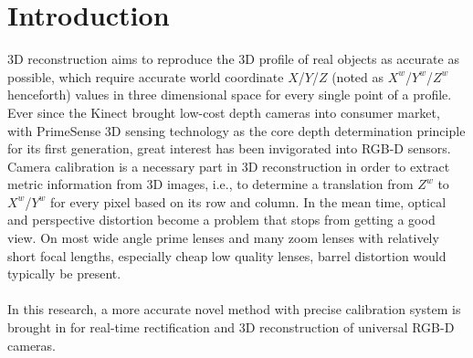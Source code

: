 \chapter{Introduction} %
\label{sens_introduction} %
3D reconstruction aims to reproduce the 3D profile of real objects as accurate as possible, which require accurate world coordinate \(X\)/\(Y\)/\(Z\) (noted as \(X^{w}\)/\(Y^{w}\)/\(Z^{w}\)  henceforth) values in three dimensional space for every single point of a profile. Ever since the Kinect brought low-cost depth cameras into consumer market, with PrimeSense 3D sensing technology as the core depth determination principle for its first generation, great interest has been invigorated into RGB-D sensors. Camera calibration is a necessary part in 3D reconstruction in order to extract metric information from 3D images, i.e., to determine a translation from \(Z^{w}\) to \(X^{w}\)/\(Y^{w}\)  for every pixel based on its row and column. In the mean time, optical and perspective distortion become a problem that stops from getting a good view. On most wide angle prime lenses and many zoom lenses with relatively short focal lengths,  especially cheap low quality lenses, barrel distortion would typically be present.
\\
\\In this research, a more accurate novel method with precise calibration system is brought in for real-time rectification and 3D reconstruction of universal RGB-D cameras. 
